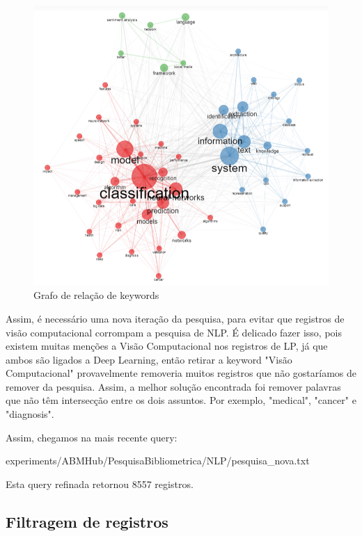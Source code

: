  \begin{figure}
    \centering
    \includegraphics[width=1\textwidth]{experiments/ABMHub/PesquisaBibliometrica/NLP/grafo_keywords.png}
    \caption{Grafo de relação de keywords}
    \label{fig:ABMHub:NLPgraph1}
\end{figure}

Assim, é necessário uma nova iteração da pesquisa, para evitar que registros de visão computacional corrompam a pesquisa de NLP. É delicado fazer isso, pois existem muitas menções a Visão Computacional nos registros de LP, já que ambos são ligados a Deep Learning, então retirar a keyword "Visão Computacional" provavelmente removeria muitos registros que não gostaríamos de remover da pesquisa. Assim, a melhor solução encontrada foi remover palavras que não têm intersecção entre os dois assuntos. Por exemplo, "medical", "cancer" e "diagnosis".

Assim, chegamos na mais recente query:


{experiments/ABMHub/PesquisaBibliometrica/NLP/pesquisa_nova.txt}

Esta query refinada retornou 8557 registros.

\subsection{Filtragem de registros}

